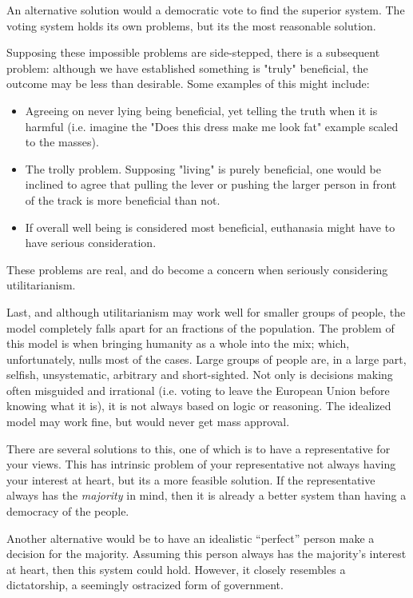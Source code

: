 \documentclass[12pt]{article}
\newcommand{\source}[1]{\footnote{\url{_num_1}}}
\let\footnote=\endnote
\begin{document}
An alternative solution would a democratic vote to find the superior system. The voting system holds its own problems, but its the most reasonable solution.

Supposing these impossible problems are side-stepped, there is a subsequent problem: although we have established something is "truly" beneficial, the outcome may be less than desirable. Some examples of this might include:

\begin{itemize}
    \item Agreeing on never lying being beneficial, yet telling the truth when it is harmful (i.e. imagine the "Does this dress make me look fat" example scaled to the masses).
    \item The trolly problem. Supposing "living" is purely beneficial, one would be inclined to agree that pulling the lever or pushing the larger person in front of the track is more beneficial than not.
    \item If overall well being is considered most beneficial, euthanasia might have to have serious consideration.
\end{itemize}

These problems are real, and do become a concern when seriously considering utilitarianism.

Last, and although utilitarianism may work well for smaller groups of people, the model completely falls apart for an fractions of the population. The problem of this model is when bringing humanity as a whole into the mix; which, unfortunately, nulls most of the cases. Large groups of people are, in a large part, selfish, unsystematic, arbitrary and short-sighted. Not only is decisions making often misguided and irrational (i.e. voting to leave the European Union before knowing what it is\source{http://fortune.com/2016/06/24/brexit-google-trends/}), it is not always based on logic or reasoning. The idealized model may work fine, but would never get mass approval.

There are several solutions to this, one of which is to have a representative for your views. This has intrinsic problem of your representative not always having your interest at heart, but its a more feasible solution. If the representative always has the \textit{majority} in mind, then it is already a better system than having a democracy of the people.

Another alternative would be to have an idealistic ``perfect'' person make a decision for the majority. Assuming this person always has the majority's interest at heart, then this system could hold. However, it closely resembles a dictatorship, a seemingly ostracized form of government.
\end{document}
